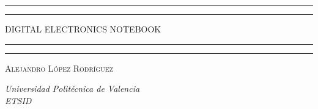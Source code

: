 \begin{titlepage} %

    \selectfont
	\centering %
	\scshape %
	\vspace*{\baselineskip} %
	
	\vspace{5\baselineskip}
	
	\rule{\textwidth}{1.6pt}\vspace*{-\baselineskip}\vspace*{2pt} %
	\rule{\textwidth}{0.4pt} %
	
	\vspace{0.75\baselineskip} %
	
	{\LARGE DIGITAL ELECTRONICS NOTEBOOK\\} %
	
	\vspace{0.75\baselineskip} %
	
	\rule{\textwidth}{0.4pt}\vspace*{-\baselineskip}\vspace{3.2pt} %
	\rule{\textwidth}{1.6pt} %
	
	\vspace{1.5\baselineskip} %


	
	{\scshape\Large Alejandro López Rodríguez \\} %
	
	\vspace{1.5\baselineskip} %
	
	\textit{Universidad Politécnica de Valencia\\ ETSID\\} 
	
	\vspace{2\baselineskip} %
	\thedate
	
	\vfill %

\end{titlepage}